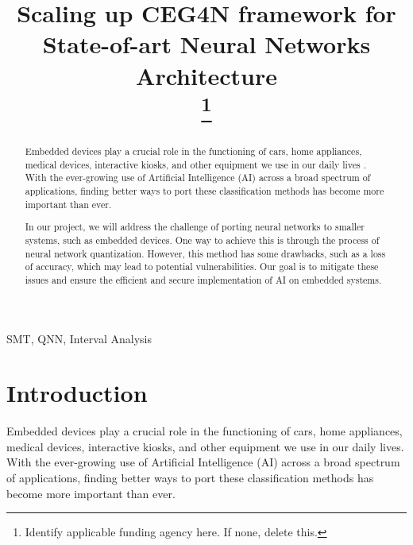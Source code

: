 \documentclass[conference]{IEEEtran}
\begin{document}
\title{Scaling up CEG4N framework for State-of-art Neural Networks Architecture\\
\thanks{Identify applicable funding agency here. If none, delete this.}
}


\author{
}

\maketitle

\begin{abstract}

Embedded devices play a crucial role in the functioning of cars, home appliances, medical devices, interactive kiosks, and other equipment we use in our daily lives \cite{c2}. With the ever-growing use of Artificial Intelligence (AI) across a broad spectrum of applications, finding better ways to port these classification methods has become more important than ever.

In our project, we will address the challenge of porting neural networks to smaller systems, such as embedded devices. One way to achieve this is through the process of neural network quantization. However, this method has some drawbacks, such as a loss of accuracy, which may lead to potential vulnerabilities. Our goal is to mitigate these issues and ensure the efficient and secure implementation of AI on embedded systems.
\end{abstract}

\begin{IEEEkeywords}
SMT, QNN, Interval Analysis 
\end{IEEEkeywords}

\section{Introduction}

Embedded devices play a crucial role in the functioning of cars, home appliances, medical devices, interactive kiosks, and other equipment we use in our daily lives\cite{c2}. With the ever-growing use of Artificial Intelligence (AI) across a broad spectrum of applications, finding better ways to port these classification methods has become more important than ever.
\end{document}
